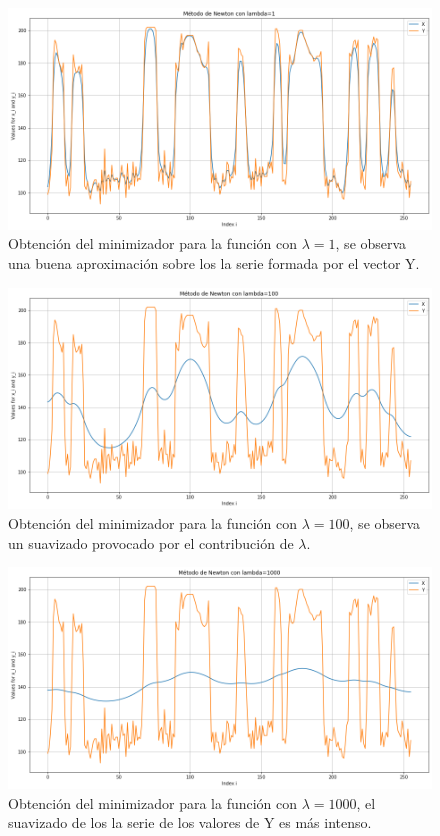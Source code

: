 \documentclass[conference]{IEEEtran}
\begin{document}
\begin{figure}[htbp]
	\centerline{\includegraphics[scale=0.26]{nl1.png}}
	\caption{Obtención del minimizador para la función con $\lambda=1$, se observa una buena aproximación sobre los la serie formada por el vector Y.}
	\label{fignl1}
\end{figure}

\begin{figure}[htbp]
	\centerline{\includegraphics[scale=0.26]{nl100.png}}
	\caption{Obtención del minimizador para la función con $\lambda=100$, se observa un suavizado provocado por el contribución de $\lambda$.}
	\label{fignl100}
\end{figure}

\begin{figure}[htbp]
	\centerline{\includegraphics[scale=0.26]{nl1000.png}}
	\caption{Obtención del minimizador para la función con $\lambda=1000$, el suavizado de los la serie de los valores de Y es más intenso.}
	\label{fignl1000}
\end{figure}
\end{document}
